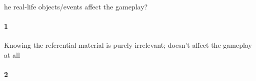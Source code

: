 he real-life objects/events affect the gameplay?\paragraph{1}Knowing the referential material is purely irrelevant; doesn't affect the gameplay at all\paragraph{2}